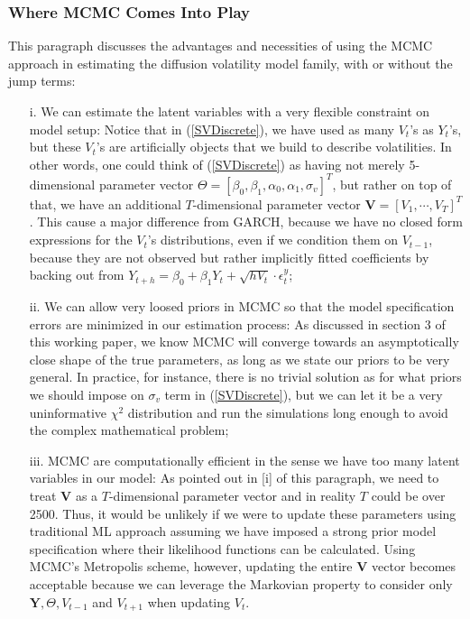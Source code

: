 \documentclass[letterpaper]{article}
\newcommand{\YY}{\mathbf{Y}}
\begin{document}
\subsubsection{Where MCMC Comes Into Play}
This paragraph discusses the advantages and necessities of using the MCMC approach in estimating the diffusion volatility model family, with or without the jump terms:
\begin{itemize}
	\item[i.] We can estimate the latent variables with a very flexible constraint on model setup:
	Notice that in (\ref{SVDiscrete}), we have used as many $V_t$'s as $Y_t$'s, but these $V_t$'s are artificially objects that we build to describe volatilities. In other words, one could think of (\ref{SVDiscrete}) as having not merely 5-dimensional parameter vector $\Theta=[\beta_0,\beta_1,\alpha_0,\alpha_1,\sigma_v]^T$, but rather on top of that, we have an additional $T$-dimensional parameter vector $\mathbf{V}=[V_1,\cdots,V_T]^T$. This cause a major difference from GARCH, because we have no closed form expressions for the $V_t$'s distributions, even if we condition them on $V_{t-1}$, because they are not observed but rather implicitly fitted coefficients by backing out from $Y_{t+h}=\beta_0+\beta_1Y_t+\sqrt{hV_t}\cdot\epsilon_t^y$;
	\item[ii.] We can allow very loosed priors in MCMC so that the model specification errors are minimized in our estimation process: As discussed in section 3 of this working paper, we know MCMC will converge towards an asymptotically close shape of the true parameters, as long as we state our priors to be very general. In practice, for instance, there is no trivial solution as for what priors we should impose on $\sigma_v$ term in (\ref{SVDiscrete}), but we can let it be a very uninformative $\chi^2$ distribution and run the simulations long enough to avoid the complex mathematical problem;
	\item[iii.] MCMC are computationally efficient in the sense we have too many latent variables in our model: As pointed out in [i] of this paragraph, we need to treat $\mathbf{V}$ as a $T$-dimensional parameter vector and in reality $T$ could be over 2500. Thus, it would be unlikely if we were to update these parameters using traditional ML approach assuming we have imposed a strong prior model specification where their likelihood functions can be calculated. Using MCMC's Metropolis scheme, however, updating the entire $\mathbf{V}$ vector becomes acceptable because we can leverage the Markovian property to consider only $\YY,\Theta,V_{t-1}$ and $V_{t+1}$ when updating $V_t$.
\end{itemize}
\end{document}
